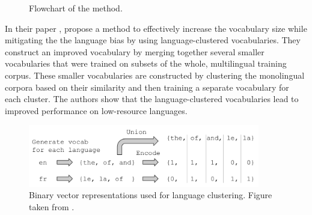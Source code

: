 \begin{figure}[ht]
    \centering
    \caption{Flowchart of the \citet{chung_improving_2020} method.}
    \label{fig:tokenization}
\end{figure}

In their paper  \cite{chung_improving_2020}, \citeauthor{chung_improving_2020} propose a method to effectively increase the vocabulary size while mitigating the the language bias by using language-clustered vocabularies. They construct an improved vocabulary by merging together several smaller vocabularies that were trained on subsets of the whole, multilingual training corpus. These smaller vocabularies are constructed by clustering the monolingual corpora based on their similarity and then training a separate vocabulary for each cluster. The authors show that the language-clustered vocabularies lead to improved performance on low-resource languages.


\begin{figure}[ht]
    \centering
    \includegraphics[width=0.9\textwidth]{img/temp/chung_language_vectors.png}
    \caption{Binary vector representations used for language clustering. Figure taken from \cite{chung_improving_2020}.}
    \label{fig:chung_vectors}
\end{figure}

